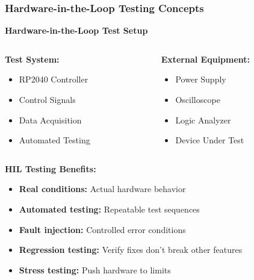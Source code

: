 \documentclass{beamer}
\begin{document}
\begin{frame}
\frametitle{Hardware-in-the-Loop Testing Concepts}
\begin{center}
\textbf{Hardware-in-the-Loop Test Setup}
\end{center}

\begin{columns}
\begin{column}{0.5\textwidth}
\textbf{Test System:}
\begin{itemize}
    \item RP2040 Controller
    \item Control Signals
    \item Data Acquisition
    \item Automated Testing
\end{itemize}
\end{column}
\begin{column}{0.5\textwidth}
\textbf{External Equipment:}
\begin{itemize}
    \item Power Supply
    \item Oscilloscope
    \item Logic Analyzer
    \item Device Under Test
\end{itemize}
\end{column}
\end{columns}

\vspace{0.5cm}
\textbf{HIL Testing Benefits:}
\begin{itemize}
    \item \textbf{Real conditions:} Actual hardware behavior
    \item \textbf{Automated testing:} Repeatable test sequences
    \item \textbf{Fault injection:} Controlled error conditions
    \item \textbf{Regression testing:} Verify fixes don't break other features
    \item \textbf{Stress testing:} Push hardware to limits
\end{itemize}
\end{frame}
\end{document}
